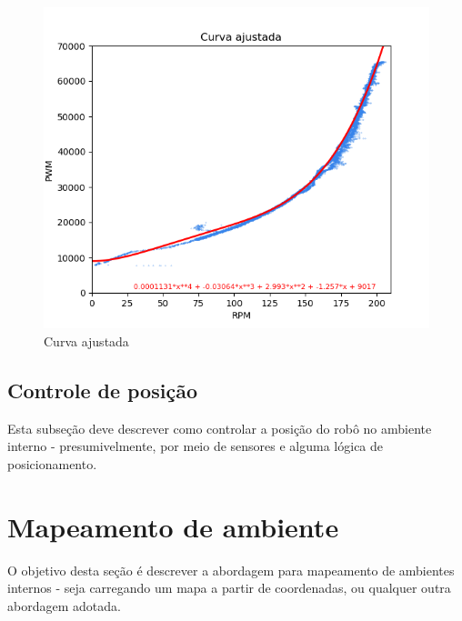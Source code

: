 \begin{figure}[h]
	\centering
	\includegraphics{figures/curva_ajustada}
	\caption{Curva ajustada}
	\label{fig:curva_ajustada}
\end{figure}



\subsection{Controle de posição}
{\color{red} Esta subseção deve descrever como controlar a posição do robô no ambiente interno - presumivelmente, por
meio de sensores e alguma lógica de posicionamento.}

\section{Mapeamento de ambiente}
{\color{red} O objetivo desta seção é descrever a abordagem para mapeamento de ambientes internos - seja carregando um
mapa a partir de coordenadas, ou qualquer outra abordagem adotada.}